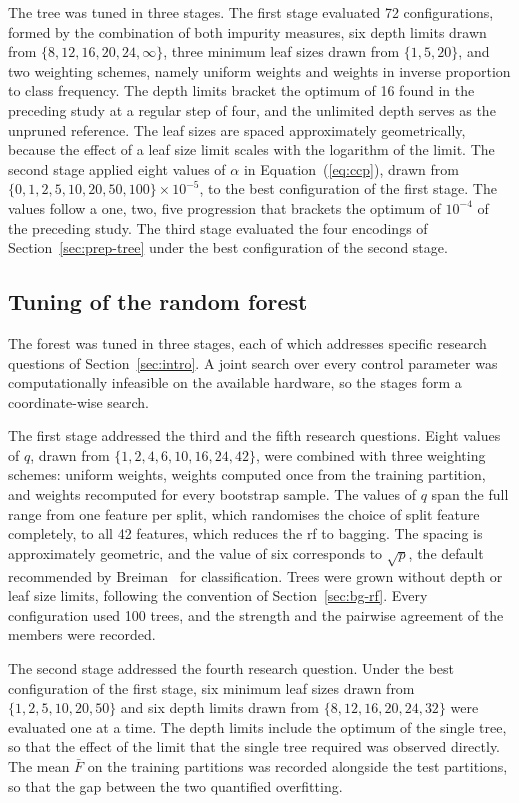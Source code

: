The tree was tuned in three stages. The first stage evaluated 72
configurations, formed by the combination of both impurity measures, six
depth limits drawn from $\{8, 12, 16, 20, 24, \infty\}$, three minimum leaf
sizes drawn from $\{1, 5, 20\}$, and two weighting schemes, namely uniform
weights and weights in inverse proportion to class frequency. The depth
limits bracket the optimum of 16 found in the preceding study at a regular
step of four, and the unlimited depth serves as the unpruned reference. The
leaf sizes are spaced approximately geometrically, because the effect of a
leaf size limit scales with the logarithm of the limit. The second stage
applied eight values of $\alpha$ in Equation~(\ref{eq:ccp}), drawn from
$\{0, 1, 2, 5, 10, 20, 50, 100\} \times 10^{-5}$, to the best configuration
of the first stage. The values follow a one, two, five progression that
brackets the optimum of $10^{-4}$ of the preceding study. The third stage
evaluated the four encodings of Section~\ref{sec:prep-tree} under the best
configuration of the second stage.

\subsection{Tuning of the random forest}
\label{sec:tune-rf}

The forest was tuned in three stages, each of which addresses specific
research questions of Section~\ref{sec:intro}. A joint search over every
control parameter was computationally infeasible on the available hardware,
so the stages form a coordinate-wise search.

The first stage addressed the third and the fifth research questions. Eight
values of $q$, drawn from $\{1, 2, 4, 6, 10, 16, 24, 42\}$, were combined with
three weighting schemes: uniform weights, weights computed once from the
training partition, and weights recomputed for every bootstrap sample. The
values of $q$ span the full range from one feature per split, which
randomises the choice of split feature completely, to all 42 features, which
reduces the \gls{rf} to bagging. The spacing is approximately geometric, and
the value of six corresponds to $\sqrt{p}$, the default recommended by
Breiman~\cite{breiman2001} for classification. Trees were grown without depth
or leaf size limits, following the convention of Section~\ref{sec:bg-rf}.
Every configuration used 100 trees, and the strength and the pairwise
agreement of the members were recorded.

The second stage addressed the fourth research question. Under the best
configuration of the first stage, six minimum leaf sizes drawn from
$\{1, 2, 5, 10, 20, 50\}$ and six depth limits drawn from
$\{8, 12, 16, 20, 24, 32\}$ were evaluated one at a time. The depth limits
include the optimum of the single tree, so that the effect of the limit
that the single tree required was observed directly. The mean $\bar{F}$ on
the training partitions was recorded alongside the test partitions, so that
the gap between the two quantified overfitting.

